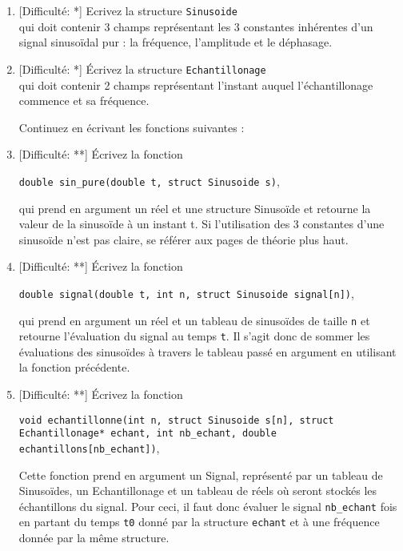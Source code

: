\documentclass[11pt]{article}
\begin{document}
\begin{enumerate}

\item \textcolor{mygreen}{[Difficulté: *]}
Ecrivez la structure \texttt{Sinusoide}\\
qui doit contenir 3 champs représentant les 3 constantes inhérentes d'un signal sinusoïdal pur : la fréquence, l'amplitude et le déphasage.

\item \textcolor{mygreen}{[Difficulté: *]}
Écrivez la structure \texttt{Echantillonage}\\ 
qui doit contenir 2 champs représentant l'instant auquel l'échantillonage commence et sa fréquence.

\vspace{20pt}
\hspace{-20pt} Continuez en écrivant les fonctions suivantes :
\vspace{20pt}

\item \textcolor{mygreen}{[Difficulté: **]}
Écrivez la fonction
\begin{center} 
\texttt{double sin\_pure(double t, struct Sinusoide s)}, 
\end{center}
qui prend en argument un réel et une structure Sinusoïde et retourne la valeur de la sinusoïde à un instant t. Si l'utilisation des 3 constantes d'une sinusoïde n'est pas claire, se référer aux pages de théorie plus haut.

\vspace{20pt}

\item \textcolor{mygreen}{[Difficulté: **]}
Écrivez la fonction
\begin{center} 
\texttt{double signal(double t, int n, struct Sinusoide signal[n])}, 
\end{center}
qui prend en argument un réel et un tableau de sinusoïdes de taille \texttt{n} et retourne l'évaluation du signal au temps \texttt{t}. Il s'agit donc de sommer les évaluations des sinusoïdes à travers le tableau passé en argument en utilisant la fonction précédente.

\vspace{20pt}

\item \textcolor{mygreen}{[Difficulté: **]}
Écrivez la fonction
\begin{center} 
\texttt{void echantillonne(int n, struct Sinusoide s[n],  
				   struct Echantillonage* echant,
                   int nb\_echant, double echantillons[nb\_echant])}, 
\end{center}
Cette fonction prend en argument un Signal, représenté par un tableau de Sinusoïdes, un Echantillonage et un tableau de réels où seront stockés les échantillons du signal. Pour ceci, il faut donc évaluer le signal \texttt{nb\_echant} fois en partant du temps \texttt{t0} donné par la structure \texttt{echant} et à une fréquence donnée par la même structure. 



\end{enumerate}
\end{document}
